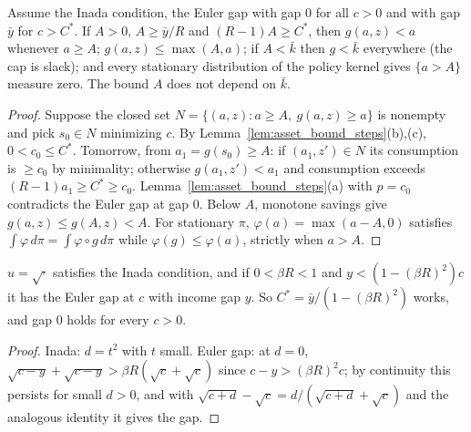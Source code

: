 \begin{theorem}
\label{thm:asset_bound}
\leanok
{}
Assume the Inada condition, the Euler gap with gap $0$ for all $c>0$ and with gap $\bar y$ for $c>C^*$. If
$A>0$, $A\ge \bar y/R$ and $(R-1)A\ge C^*$, then $g(a,z)<a$ whenever $a\ge A$; $g(a,z)\le\max(A,a)$; if $A<\bar k$
then $g<\bar k$ everywhere (the cap is slack); and every stationary distribution of the policy kernel gives
$\{a>A\}$ measure zero. The bound $A$ does not depend on $\bar k$.
\end{theorem}
\begin{proof}
\leanok
Suppose the closed set $N = \{(a,z): a\ge A,\ g(a,z)\ge a\}$ is nonempty and pick $s_0\in N$ minimizing $c$. By
Lemma~\ref{lem:asset_bound_steps}(b),(c), $0<c_0\le C^*$. Tomorrow, from $a_1 = g(s_0)\ge A$: if $(a_1,z')\in N$ its
consumption is $\ge c_0$ by minimality; otherwise $g(a_1,z')<a_1$ and consumption exceeds $(R-1)a_1\ge C^*\ge c_0$.
Lemma~\ref{lem:asset_bound_steps}(a) with $p = c_0$ contradicts the Euler gap at gap $0$. Below $A$, monotone
savings give $g(a,z)\le g(A,z)<A$. For stationary $\pi$, $\varphi(a) = \max(a-A,0)$ satisfies
$\int\varphi\,d\pi = \int\varphi\circ g\,d\pi$ while $\varphi(g)\le\varphi(a)$, strictly when $a>A$.
\end{proof}

\begin{lemma}
\label{lem:sqrt_euler_gap}
\leanok
{}
$u=\sqrt{\cdot}$ satisfies the Inada condition, and if $0<\beta R<1$ and $y<(1-(\beta R)^2)c$ it has the Euler gap at
$c$ with income gap $y$. So $C^* = \bar y/(1-(\beta R)^2)$ works, and gap $0$ holds for every $c>0$.
\end{lemma}
\begin{proof}
\leanok
Inada: $d = t^2$ with $t$ small. Euler gap: at $d=0$, $\sqrt{c-y}+\sqrt{c-y} > \beta R(\sqrt c+\sqrt c)$ since
$c-y>(\beta R)^2c$; by continuity this persists for small $d>0$, and with
$\sqrt{c+d}-\sqrt c = d/(\sqrt{c+d}+\sqrt c)$ and the analogous identity it gives the gap.
\end{proof}

